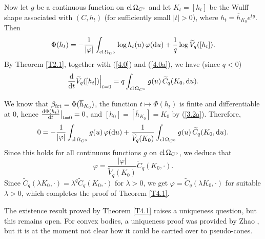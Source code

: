 \documentclass[12pt]{article}
\newcommand{\0}{\mbox{\boldmath$o$}}
\newcommand{\D}{{\rm d}}
\begin{document}
Now let $g$ be a continuous function on ${\rm cl}\,\Omega_{C^\circ}$ and let $K_t=[h_t]$ be the Wulff shape associated with $(C,h_t)$ (for sufficiently small $|t|>0$), where $h_t= \overline h_{K_0}e^{tg}$. Then
$$ \Phi(h_t) = -\frac{1}{|\varphi|} \int_{{\rm cl}\,\Omega_{C^\circ}} \log h_t(u)\,\varphi(\D u) +\frac{1}{q} \log\widetilde V_q([h_t]).$$
By Theorem \ref{T2.1}, together with (\ref{4.0}) and (\ref{4.0a}), we have (since $q<0$)
$$ \frac{\D}{\D t} \widetilde V_q([h_t])\Big|_{t=0} = q\int_{{\rm cl}\,\Omega_{C^\circ}} g(u)\,\widetilde C_q(K_0,\D u).$$

We know that $\beta_{\rm fct} = \Phi(\overline h_{K_0})$, the function $t\mapsto \Phi(h_t)$ is finite and differentiable at $0$, hence $\frac{\D \Phi(h_t)}{\D t}\big|_{t=0}=0$, and $[h_0]=[\overline h_{K_0}]= K_0$ by (\ref{3.2a}). Therefore,
$$ 0= -\frac{1}{|\varphi|} \int_{{\rm cl}\,\Omega_{C^\circ}} g(u)\,\varphi(\D u) +\frac{1}{\widetilde V_q(K_0)} \int_{{\rm cl}\,\Omega_{C^\circ}} g(u)\,\widetilde C_q(K_0,\D u).$$
Since this holds for all continuous functions $g$ on  ${\rm cl}\,\Omega_{C^\circ}$, we deduce that
$$ \varphi = \frac{|\varphi|}{\widetilde V_q(K_0)}\widetilde C_q(K_0,\cdot).$$
Since $\widetilde C_q(\lambda K_0,\cdot) = \lambda^q\widetilde C_q(K_0,\cdot)$ for $\lambda>0$, we get $\varphi= \widetilde C_q(\lambda K_0,\cdot)$ for suitable $\lambda>0$, which completes the proof of Theorem \ref{T4.1}.

The existence result proved by Theorem \ref{T4.1} raises a uniqueness question, but this remains open. For convex bodies, a uniqueness proof was provided by Zhao \cite{Zha17}, but it is at the moment not clear how it could be carried over to pseudo-cones.
\end{document}
